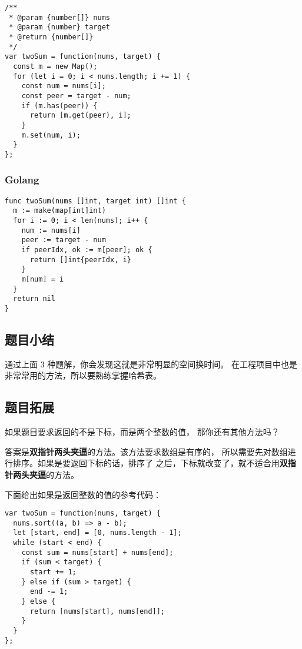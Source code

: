 \begin{verbatim}
/**
 * @param {number[]} nums
 * @param {number} target
 * @return {number[]}
 */
var twoSum = function(nums, target) {
  const m = new Map();
  for (let i = 0; i < nums.length; i += 1) {
    const num = nums[i];
    const peer = target - num;
    if (m.has(peer)) {
      return [m.get(peer), i];
    }
    m.set(num, i);
  }
};
\end{verbatim}

\subsubsection{Golang}

\begin{verbatim}
func twoSum(nums []int, target int) []int {
  m := make(map[int]int)
  for i := 0; i < len(nums); i++ {
    num := nums[i]
    peer := target - num
    if peerIdx, ok := m[peer]; ok {
      return []int{peerIdx, i}
    }
    m[num] = i
  }
  return nil
}
\end{verbatim}

\subsection{题目小结}

通过上面 3 种题解，你会发现这就是非常明显的空间换时间。
在工程项目中也是非常常用的方法，所以要熟练掌握哈希表。

\subsection{题目拓展}

如果题目要求返回的不是下标，而是两个整数的值，
那你还有其他方法吗？

答案是\textbf{双指针两头夹逼}的方法。该方法要求数组是有序的，
所以需要先对数组进行排序。如果是要返回下标的话，排序了
之后，下标就改变了，就不适合用\textbf{双指针两头夹逼}的方法。

下面给出如果是返回整数的值的参考代码：

\begin{verbatim}
var twoSum = function(nums, target) {
  nums.sort((a, b) => a - b);
  let [start, end] = [0, nums.length - 1];
  while (start < end) {
    const sum = nums[start] + nums[end];
    if (sum < target) {
      start += 1;
    } else if (sum > target) {
      end -= 1;
    } else {
      return [nums[start], nums[end]];
    }
  }
};
\end{verbatim}
